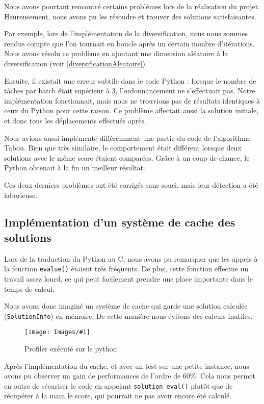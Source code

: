 \documentclass[hideweeklyreports]{polytech/polytech}
\newcommand{\img}[3]{%
	\begin{figure}[H]
		\centering
   		\texttt{[image: Images/\#1]}
  	 	\caption{#2}
	\end{figure}
}
\newcommand{\codec}[1]{\texttt{#1}}
\begin{document}
				Nous avons pourtant rencontré certains problèmes lors de la réalisation du projet. Heureusement, nous avons pu les résoudre et trouver des solutions satisfaisantes.
				
				Par exemple, lors de l'implémentation de la diversification, nous nous sommes rendus compte que l'on tournait en boucle après un certain nombre d'itérations. Nous avons résolu ce problème en ajoutant une dimension aléatoire à la diversification (voir \autoref{diversificationAleatoire}).
				
				Ensuite, il existait une erreur subtile dans le code Python : lorsque le nombre de tâches par batch était supérieur à 3, l'ordonnancement ne s'effectuait pas. Notre implémentation fonctionnait, mais nous ne trouvions pas de résultats identiques à ceux du Python pour cette raison. Ce problème affectait aussi la solution initiale, et donc tous les déplacements effectués après.
				
				Nous avions aussi implémenté différemment une partie du code de l'algorithme Tabou. Bien que très similaire, le comportement était différent lorsque deux solutions avec le même score étaient comparées. Grâce à un coup de chance, le Python obtenait à la fin un meilleur résultat.
				
				Ces deux derniers problèmes ont été corrigés sans souci, mais leur détection a été laborieuse.
				
			\subsection{\label{cache}Implémentation d'un système de cache des solutions}
				Lors de la traduction du Python au C, nous avons pu remarquer que les appels à la fonction \codec{evalue()} étaient très fréquents. De plus, cette fonction effectue un travail assez lourd, ce qui peut facilement prendre une place importante dans le temps de calcul.
				
				Nous avons donc imaginé un système de cache qui garde une solution calculée (\codec{SolutionInfo}) en mémoire. De cette manière nous évitons des calculs inutiles.
				
				\img{PythonProfilerTop.png}{Profiler exécuté sur le python}{0.3}
				
				Après l'implémentation du cache, et avec un test sur une petite instance, nous avons pu observer un gain de performances de l'ordre de 60\%. Cela nous permet en outre de sécuriser le code en appelant \codec{solution\_eval()} plutôt que de récupérer à la main le score, qui pourrait ne pas avoir encore été calculé.
			
\end{document}
